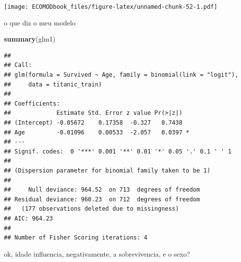 \documentclass[
]{book}
\newenvironment{Shaded}{\begin{snugshade}}{\end{snugshade}}
\newcommand{\FunctionTok}[1]{\textcolor[rgb]{0.13,0.29,0.53}{\textbf{#1}}}
\newcommand{\NormalTok}[1]{#1}
\begin{document}
\texttt{[image: ECOMODbook\_files/figure-latex/unnamed-chunk-52-1.pdf]}

o que diz o meu modelo

\begin{Shaded}
\begin{Highlighting}[]
\FunctionTok{summary}\NormalTok{(glm1)}
\end{Highlighting}
\end{Shaded}

\begin{verbatim}
## 
## Call:
## glm(formula = Survived ~ Age, family = binomial(link = "logit"), 
##     data = titanic_train)
## 
## Coefficients:
##             Estimate Std. Error z value Pr(>|z|)  
## (Intercept) -0.05672    0.17358  -0.327   0.7438  
## Age         -0.01096    0.00533  -2.057   0.0397 *
## ---
## Signif. codes:  0 '***' 0.001 '**' 0.01 '*' 0.05 '.' 0.1 ' ' 1
## 
## (Dispersion parameter for binomial family taken to be 1)
## 
##     Null deviance: 964.52  on 713  degrees of freedom
## Residual deviance: 960.23  on 712  degrees of freedom
##   (177 observations deleted due to missingness)
## AIC: 964.23
## 
## Number of Fisher Scoring iterations: 4
\end{verbatim}

ok, idade influencia, negativamente, a sobrevivencia, e o sexo?
\end{document}
